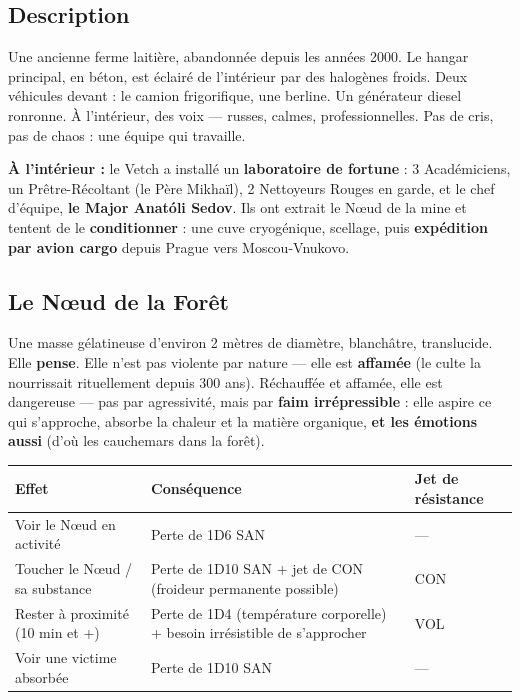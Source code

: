 \documentclass[10pt,a5paper,twoside]{book}
\begin{document}
\subsection{Description}

\begin{shaded}
Une ancienne ferme laitière, abandonnée depuis les années 2000. Le hangar principal, en béton, est éclairé de l'intérieur par des halogènes froids. Deux véhicules devant : le camion frigorifique, une berline. Un générateur diesel ronronne. À l'intérieur, des voix --- russes, calmes, professionnelles. Pas de cris, pas de chaos : une équipe qui travaille.
\end{shaded}

\textbf{À l'intérieur :} le Vetch a installé un \textbf{laboratoire de fortune} : 3 Académiciens, un Prêtre-Récoltant (le Père Mikhaïl), 2 Nettoyeurs Rouges en garde, et le chef d'équipe, \textbf{le Major Anatóli Sedov}. Ils ont extrait le Nœud de la mine et tentent de le \textbf{conditionner} : une cuve cryogénique, scellage, puis \textbf{expédition par avion cargo} depuis Prague vers Moscou-Vnukovo.

\clearpage

\subsection{Le Nœud de la Forêt}

\begin{shaded}
Une masse gélatineuse d'environ 2 mètres de diamètre, blanchâtre, translucide. Elle \textbf{pense}. Elle n'est pas violente par nature --- elle est \textbf{affamée} (le culte la nourrissait rituellement depuis 300 ans). Réchauffée et affamée, elle est dangereuse --- pas par agressivité, mais par \textbf{faim irrépressible} : elle aspire ce qui s'approche, absorbe la chaleur et la matière organique, \textbf{et les émotions aussi} (d'où les cauchemars dans la forêt).
\end{shaded}

\begin{center}
\begin{tabular}{|P{3.0cm}|P{5.0cm}|P{3.0cm}|}
\hline
\textbf{Effet} & \textbf{Conséquence} & \textbf{Jet de résistance} \\
\hline
Voir le Nœud en activité & Perte de 1D6 SAN & --- \\
\hline
Toucher le Nœud / sa substance & Perte de 1D10 SAN + jet de CON (froideur permanente possible) & CON \\
\hline
Rester à proximité (10 min et +) & Perte de 1D4 (température corporelle) + besoin irrésistible de s'approcher & VOL \\
\hline
Voir une victime absorbée & Perte de 1D10 SAN & --- \\
\hline
\end{tabular}
\end{center}
\end{document}
